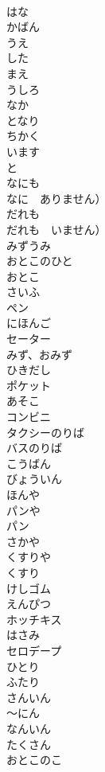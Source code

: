 \documentclass[8pt]{extreport}
\begin{document}
\begin{CJK}{UTF8}{min}
\\	はな		
\\	かばん		
\\	うえ		
\\	した		
\\	まえ		
\\	うしろ		
\\	なか		
\\	となり		
\\	ちかく		
\\	います		
\\	と		
\\	なにも	
\\	なに　ありません）	
\\	だれも	
\\	だれも　いません）	
\\	みずうみ		
\\	おとこのひと		
\\	おとこ		
\\	さいふ		
\\	ペン		
\\	にほんご		
\\	セーター		
\\	みず、おみず		
\\	ひきだし		
\\	ポケット		
\\	あそこ		
\\	コンビニ		
\\	タクシーのりば		
\\	バスのりば		
\\	こうばん		
\\	びょういん		
\\	ほんや		
\\	パンや		
\\	パン		
\\	さかや		
\\	くすりや		
\\	くすり		
\\	けしゴム		
\\	えんぴつ		
\\	ホッチキス		
\\	はさみ		
\\	セロデープ		
\\	ひとり		
\\	ふたり		
\\	さんいん		
\\	〜にん		
\\	なんいん		
\\	たくさん		
\\	おとこのこ		

\end{CJK}
\end{document}
